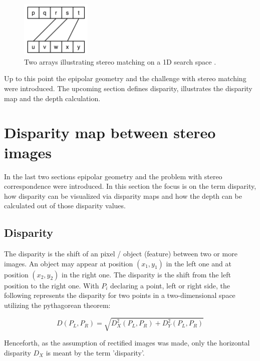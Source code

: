 \begin{figure}[h!]
  \centering
  \includegraphics[width=0.3\textwidth]{src/images/stereo-matching.png}
  \caption{Two arrays illustrating stereo matching on a 1D search space \citep{kack2004robust}.}
  \label{fig:stereo-matching}
\end{figure}

\noindent Up to this point the epipolar geometry and the challenge with stereo matching were introduced.
The upcoming section defines disparity, illustrates the disparity map and the depth calculation.

\section{Disparity map between stereo images}

In the last two sections epipolar geometry and the problem with stereo correspondence were introduced.
In this section the focus is on the term disparity, how disparity can be visualized via disparity maps and how the depth can be calculated out of those disparity values.

\subsection*{Disparity}

The disparity is the shift of an pixel / object (feature) between two or more images.
An object may appear at position $(x_1,y_1)$ in the left one and at position $(x_2,y_2)$ in the right one.
The disparity is the shift from the left position to the right one.
With $P_i$ declaring a point, left or right side, the following represents the disparity for two points in a two-dimensional space utilizing the pythagorean theorem:

\begin{equation}
  D(P_L,P_R) = \sqrt{D^2_X(P_L,P_R) + D^2_Y(P_L,P_R)}
\end{equation}

\noindent Henceforth, as the assumption of rectified images was made, only the horizontal disparity $D_X$ is meant by the term 'disparity'.

